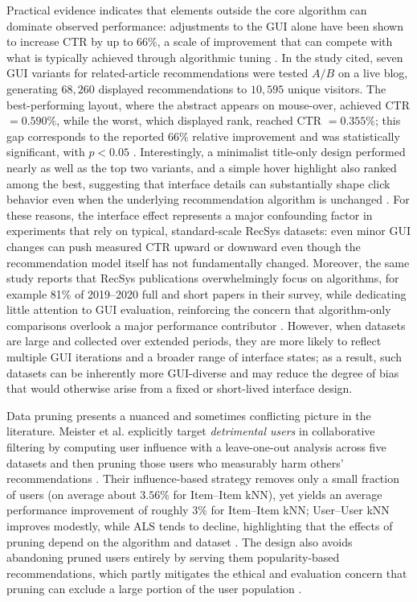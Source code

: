 \documentclass[12pt,a4paper]{article}
\begin{document}
Practical evidence indicates that elements outside the core algorithm can dominate observed performance: adjustments to the GUI alone have been shown to increase CTR by up to $66\%$, a scale of improvement that can compete with what is typically achieved through algorithmic tuning \cite{beel2021}. In the study cited, seven GUI variants for related-article recommendations were tested $A/B$ on a live blog, generating $68,260$ displayed recommendations to $10,595$ unique visitors. The best-performing layout, where the abstract appears on mouse-over, achieved CTR $=0.590\%$, while the worst, which displayed rank, reached CTR $=0.355\%$; this gap corresponds to the reported $66\%$ relative improvement and was statistically significant, with $p<0.05$ \cite{beel2021}. Interestingly, a minimalist title-only design performed nearly as well as the top two variants, and a simple hover highlight also ranked among the best, suggesting that interface details can substantially shape click behavior even when the underlying recommendation algorithm is unchanged \cite{beel2021}. For these reasons, the interface effect represents a major confounding factor in experiments that rely on typical, standard-scale RecSys datasets: even minor GUI changes can push measured CTR upward or downward even though the recommendation model itself has not fundamentally changed. Moreover, the same study reports that RecSys publications overwhelmingly focus on algorithms, for example 81\% of 2019--2020 full and short papers in their survey, while dedicating little attention to GUI evaluation, reinforcing the concern that algorithm-only comparisons overlook a major performance contributor \cite{beel2021}. However, when datasets are large and collected over extended periods, they are more likely to reflect multiple GUI iterations and a broader range of interface states; as a result, such datasets can be inherently more GUI-diverse and may reduce the degree of bias that would otherwise arise from a fixed or short-lived interface design.

Data pruning presents a nuanced and sometimes conflicting picture in the literature. Meister et al. explicitly target \emph{detrimental users} in collaborative filtering by computing user influence with a leave-one-out analysis across five datasets and then pruning those users who measurably harm others' recommendations \cite{meister2024}. Their influence-based strategy removes only a small fraction of users (on average about $3.56\%$ for Item--Item kNN), yet yields an average performance improvement of roughly $3\%$ for Item--Item kNN; User--User kNN improves modestly, while ALS tends to decline, highlighting that the effects of pruning depend on the algorithm and dataset \cite{meister2024}. The design also avoids abandoning pruned users entirely by serving them popularity-based recommendations, which partly mitigates the ethical and evaluation concern that pruning can exclude a large portion of the user population \cite{meister2024}.
\end{document}
